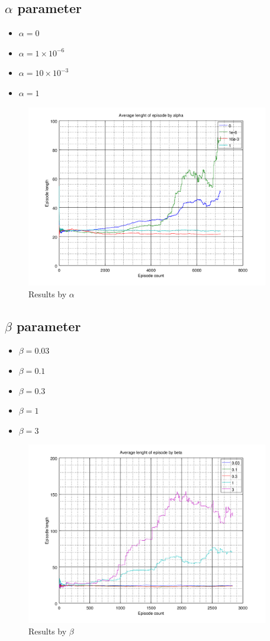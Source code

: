 \documentclass[a4paper,11pt]{article}
\begin{document}
\subsection{$ \alpha $ parameter}

\begin{itemize}
	\item $\alpha = 0 $
	\item $\alpha = 1 \times 10^{-6} $
	\item $\alpha = 10 \times 10^{-3} $
	\item $\alpha = 1 $
\end{itemize}
\begin{figure}
	\label{fig:alpha}
	\includegraphics[width=300pt]{alpha}
	\caption{Results by $\alpha$}
\end{figure}


\subsection{$ \beta $ parameter}

\begin{itemize}
	\item $\beta = 0.03 $
	\item $\beta = 0.1 $
	\item $\beta = 0.3 $
	\item $\beta = 1 $
	\item $\beta = 3 $
\end{itemize}
\begin{figure}
	\label{fig:beta}
	\includegraphics[width=300pt]{beta}
	\caption{Results by $\beta$}
\end{figure}
\end{document}
